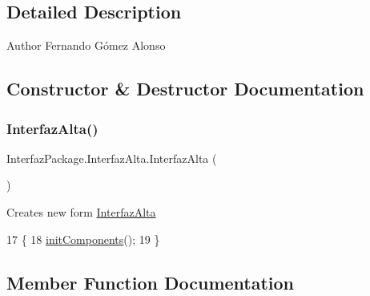 \subsection{Detailed Description}
\begin{DoxyAuthor}{Author}
Fernando Gómez Alonso 
\end{DoxyAuthor}


\subsection{Constructor \& Destructor Documentation}
\mbox{\label{class_interfaz_package_1_1_interfaz_alta_a34f6dce200e1d6e15b1619d6413e6330}} 
\subsubsection{\texorpdfstring{Interfaz\+Alta()}{InterfazAlta()}}
{\footnotesize\ttfamily Interfaz\+Package.\+Interfaz\+Alta.\+Interfaz\+Alta (\begin{DoxyParamCaption}{ }\end{DoxyParamCaption})\hspace{0.3cm}{\ttfamily [inline]}}

Creates new form \mbox{\hyperlink{class_interfaz_package_1_1_interfaz_alta}{Interfaz\+Alta}} 
\begin{DoxyCode}
17                           \{
18         \mbox{\hyperlink{class_interfaz_package_1_1_interfaz_alta_aac245148fe9ffbe8e56f0380a41abc9c}{initComponents}}();
19     \}
\end{DoxyCode}


\subsection{Member Function Documentation}
\mbox{\label{class_interfaz_package_1_1_interfaz_alta_aac245148fe9ffbe8e56f0380a41abc9c}} 
